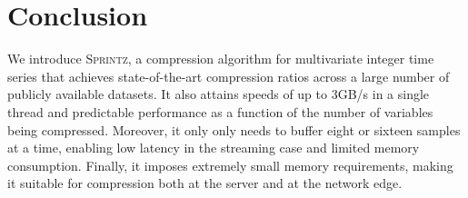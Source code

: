 \documentclass[acmlarge]{acmart}
\newcommand{\mine}{\textsc{Sprintz}}
\newcommand{\minesp}{\textsc{Sprintz}\text{ }}
\newcommand{\fire}{\textsc{Fire}\text{ }}
\begin{document}
\section{Conclusion} \label{sec:conclusion}

We introduce \mine, a compression algorithm for multivariate integer time series that achieves state-of-the-art compression ratios across a large number of publicly available datasets. It also attains speeds of up to 3GB/s in a single thread and predictable performance as a function of the number of variables being compressed. Moreover, it only only needs to buffer eight or sixteen samples at a time, enabling low latency in the streaming case and limited memory consumption. Finally, it imposes extremely small memory requirements, making it suitable for compression both at the server and at the network edge. %







% 




% 



\balance
\end{document}
